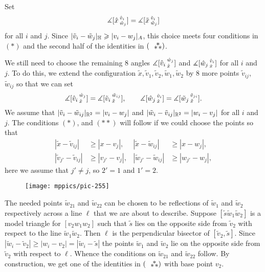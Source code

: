 \documentclass{article}
\begin{document}
Set 
\[\measuredangle [\hat x\,{}^{\hat v_i}_{\hat w_j}]
=
\measuredangle [\tilde x\,{}^{\tilde v_i}_{\tilde w_j}]\]
for all $i$ and $j$.
Since $|\tilde v_i-\tilde w_j|_{\mathbb H}\geqslant |v_i-w_j|_{A}$, this choice meets four conditions in $({*})$ and the second half of the identities in $(\asterism)$.

We still need to choose the remaining 8 angles $\measuredangle [\hat v_i\,{}^{\hat w_j}_{\hat x}]$ and $\measuredangle [\hat w_j\,{}^{\hat v_i}_{\hat x}]$ for all $i$ and $j$.
To do this, we extend the configuration $\tilde x,\tilde v_1,\tilde v_2,\tilde w_1,\tilde w_2$ by 8 more points 
$\tilde v_{ij}$, $\tilde w_{ij}$ so that we can set 
\[
\measuredangle [\hat v_i\,{}^{\hat w_j}_{\hat x}]=\measuredangle [\tilde v_i\,{}^{\tilde w_{ij}}_{\tilde x}],
\qquad
\measuredangle [\hat w_j\,{}^{\hat v_i}_{\hat x}]=\measuredangle [\tilde w_j\,{}^{\tilde v_{ji}}_{\tilde x}].
\]
We assume that $|\tilde v_i-\tilde w_{ij}|_{\mathbb{R}^2}=|v_i-w_j|$ and $|\tilde w_i-\tilde v_{ij}|_{\mathbb{R}^2}=|w_i-v_j|$ for all $i$ and~$j$.
The conditions $({*})$, and $({*}{*})$ will follow if we could choose the points so that
\begin{align*}
|\tilde x-\tilde v_{ij}|&\ge | x-v_j|,
&
|\tilde x-\tilde w_{ij}|&\ge | x-w_j|,
\\
|\tilde v_{j'}-\tilde v_{ij}|&\ge | v_{j'}-v_j|,
&
|\tilde w_{j'}-\tilde w_{ij}|&\ge |w_{j'}-w_j|,
\end{align*}
here we assume that $j'\ne j$, so $2'=1$ and $1'=2$.

\begin{wrapfigure}{r}{33mm}
\vskip4mm
\centering
\texttt{[image: mppics/pic-255]}
\end{wrapfigure}

The needed points $\tilde w_{21}$ and $\tilde w_{22}$ can be chosen to be reflections of $\tilde w_{1}$ and $\tilde w_{2}$ respectively across a line $\ell$ that we are about to describe.
Suppose $[\tilde s\tilde w_1 \tilde w_2]$ is a model triangle for $[v_2w_1w_2]$ such that $\tilde s$ lies on the opposite side from $\tilde v_2$ with respect to the line $\tilde w_1\tilde w_2$.
Then $\ell$ is the perpendicular bisector of $[\tilde v_2, \tilde s]$.
Since $|\tilde w_i-\tilde v_2|\ge | w_i- v_2|=|\tilde w_i-\tilde s|$ the points $\tilde w_1$ and $\tilde w_2$ lie on the opposite side from $\tilde v_2$ with respect to $\ell$.
Whence the conditions on $\tilde w_{21}$ and $\tilde w_{22}$ follow.
By construction, we get one of the identities in $(\asterism)$ with base point $v_2$.
\end{document}
